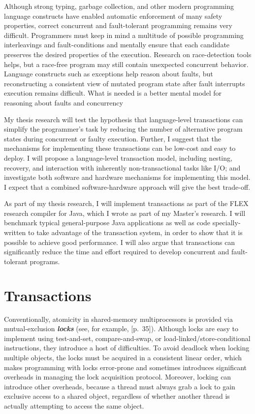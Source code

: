 \documentclass[12pt,twoside]{article}
\newcommand{\defn}[1]           {{\textit{\textbf{\boldmath #1}}}}
\begin{document}
\cleardoublepage

Although strong typing, garbage collection, and other modern
programming language constructs have enabled automatic enforcement of
many safety properties, correct concurrent and fault-tolerant
programming remains very difficult.  Programmers must keep in mind a
multitude of possible programming interleavings and fault-conditions
and mentally ensure that each candidate preserves the desired
properties of the execution.  Research on race-detection tools helps,
but a race-free program may still contain unexpected concurrent
behavior.  Language constructs such as exceptions help reason about
faults, but reconstructing a consistent view of mutated program state
after fault interrupts execution remains difficult.  What is needed is
a better mental model for reasoning about faults and concurrency

My thesis research will test the hypothesis that language-level
transactions can simplify the programmer's task by reducing the number
of alternative program states during concurrent or faulty execution.
Further, I suggest that the mechanisms for implementing
these transactions can be low-cost and easy to deploy.  I will
propose a language-level transaction model, including nesting,
recovery, and interaction with inherently non-transactional tasks like
I/O; and investigate both software and hardware mechanisms for
implementing this model.  I expect that a combined
software-hardware approach will give the best trade-off.

As part of my thesis research, I will implement transactions as part
of the FLEX research compiler for Java, which I wrote as part of my
Master's research.  I will benchmark typical general-purpose Java
applications as well as code specially-written to take advantage of
the transaction system, in order to show that it is possible to achieve good
performance.  I will also argue that transactions can significantly
reduce the time and effort required to develop concurrent and
fault-tolerant programs.

\section{Transactions}

Conventionally, atomicity in shared-memory multiprocessors is provided
via mutual-exclusion \defn{locks} (see, for example,
\cite{Tanenbaum92}[p.~35]).  Although locks are easy to
implement using test-and-set, compare-and-swap, or
load-linked/{\bp}store-conditional instructions, they introduce a host of
difficulties.  To avoid deadlock when locking multiple objects, the
locks must be acquired in a consistent linear order, which makes
programming with locks error-prone and sometimes introduces
significant overheads in managing the lock acquisition protocol.
Moreover, locking can introduce other overheads, because a thread must
always grab a lock to gain exclusive access to a shared object,
regardless of whether another thread is actually attempting to access
the same object.
\end{document}
